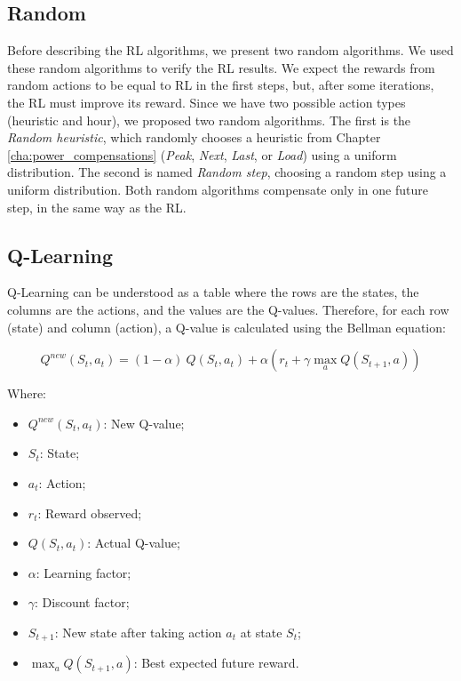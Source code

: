 \subsection{Random}
Before describing the RL algorithms, we present two random algorithms. We used these random algorithms to verify the RL results. We expect the rewards from random actions to be equal to RL in the first steps, but, after some iterations, the RL must improve its reward. Since we have two possible action types (heuristic and hour), we proposed two random algorithms. The first is the \emph{Random heuristic}, which randomly chooses a heuristic from Chapter \ref{cha:power_compensations} (\emph{Peak}, \emph{Next}, \emph{Last}, or \emph{Load}) using a uniform distribution. The second is named \emph{Random step}, choosing a random step using a uniform distribution. Both random algorithms compensate only in one future step, in the same way as the RL.

\subsection{Q-Learning}
Q-Learning can be understood as a table where the rows are the states, the columns are the actions, and the values are the Q-values. Therefore, for each row (state) and column (action), a Q-value is calculated using the Bellman equation:

\begin{equation}
    Q^{new}(S_t, a_t) = (1 - \alpha)\ Q(S_t, a_t) + \alpha (r_t + \gamma \max_a Q(S_{t+1}, a) )
\end{equation}

Where:
\begin{itemize}
    \item $Q^{new}(S_t, a_t)$: New Q-value;
    \item $S_t$: State;
    \item $a_t$: Action;
    \item $r_t$: Reward observed;
    \item $Q(S_t, a_t)$: Actual Q-value;
    \item $\alpha$: Learning factor;
    \item $\gamma$: Discount factor;
    \item $S_{t+1}$: New state after taking action $a_t$ at state $S_t$;
    \item $\max_a Q(S_{t+1}, a)$: Best expected future reward.
\end{itemize}

